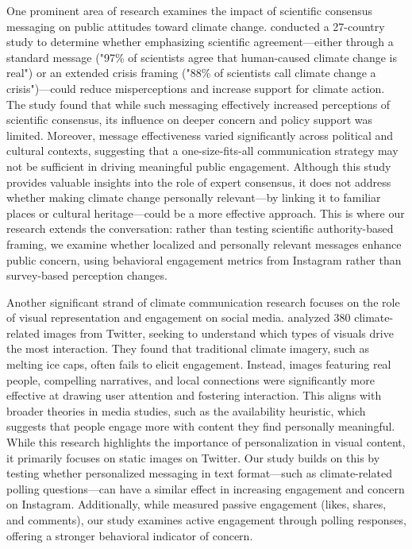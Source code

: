 \documentclass[a4paper,11pt]{article}
\begin{document}
One prominent area of research examines the impact of scientific consensus messaging on public attitudes toward climate change. \cite{Veckalov2024} conducted a 27-country study to determine whether emphasizing scientific agreement—either through a standard message ("97\% of scientists agree that human-caused climate change is real") or an extended crisis framing ("88\% of scientists call climate change a crisis")—could reduce misperceptions and increase support for climate action. The study found that while such messaging effectively increased perceptions of scientific consensus, its influence on deeper concern and policy support was limited. Moreover, message effectiveness varied significantly across political and cultural contexts, suggesting that a one-size-fits-all communication strategy may not be sufficient in driving meaningful public engagement. Although this study provides valuable insights into the role of expert consensus, it does not address whether making climate change personally relevant—by linking it to familiar places or cultural heritage—could be a more effective approach. This is where our research extends the conversation: rather than testing scientific authority-based framing, we examine whether localized and personally relevant messages enhance public concern, using behavioral engagement metrics from Instagram rather than survey-based perception changes.

Another significant strand of climate communication research focuses on the role of visual representation and engagement on social media. \cite{Leon2022} analyzed 380 climate-related images from Twitter, seeking to understand which types of visuals drive the most interaction. They found that traditional climate imagery, such as melting ice caps, often fails to elicit engagement. Instead, images featuring real people, compelling narratives, and local connections were significantly more effective at drawing user attention and fostering interaction. This aligns with broader theories in media studies, such as the availability heuristic, which suggests that people engage more with content they find personally meaningful. While this research highlights the importance of personalization in visual content, it primarily focuses on static images on Twitter. Our study builds on this by testing whether personalized messaging in text format—such as climate-related polling questions—can have a similar effect in increasing engagement and concern on Instagram. Additionally, while \cite{Leon2022} measured passive engagement (likes, shares, and comments), our study examines active engagement through polling responses, offering a stronger behavioral indicator of concern.
\end{document}
